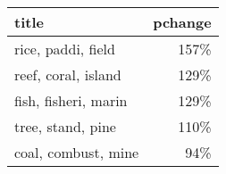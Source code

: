 \begin{tabular}{lr}
\toprule
                title &  pchange \\
\midrule
   rice, paddi, field &     157\% \\
  reef, coral, island &     129\% \\
 fish, fisheri, marin &     129\% \\
    tree, stand, pine &     110\% \\
  coal, combust, mine &      94\% \\
\bottomrule
\end{tabular}
